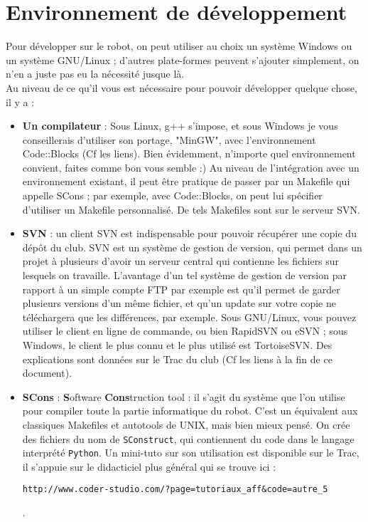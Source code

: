 
\section{Environnement de développement}

Pour développer sur le robot, on peut utiliser au choix un système Windows ou un système GNU/Linux ; d'autres plate-formes peuvent s'ajouter simplement, on n'en a juste pas eu la nécessité jusque là.\\
Au niveau de ce qu'il vous est nécessaire pour pouvoir développer quelque chose, il y a :\\
\begin{itemize}
\item \textbf{Un compilateur} : Sous Linux, g++ s'impose, et sous Windows je vous conseillerais d'utiliser son portage, "MinGW", avec l'environnement Code::Blocks (Cf les liens). Bien évidemment, n'importe quel environnement convient, faites comme bon vous semble :) Au niveau de l'intégration avec un environnement existant, il peut être pratique de passer par un Makefile qui appelle SCons ; par exemple, avec Code::Blocks, on peut lui spécifier d'utiliser un Makefile personnalisé. De tels Makefiles sont sur le serveur SVN.\\
\item \textbf{SVN} : un client SVN est indispensable pour pouvoir récupérer une copie du dépôt du club. SVN est un système de gestion de version, qui permet dans un projet à plusieurs d'avoir un serveur central qui contienne les fichiers sur lesquels on travaille. L'avantage d'un tel système de gestion de version par rapport à un simple compte FTP par exemple est qu'il permet de garder plusieurs versions d'un même fichier, et qu'un update sur votre copie ne téléchargera que les différences, par exemple. Sous GNU/Linux, vous pouvez utiliser le client en ligne de commande, ou bien RapidSVN ou eSVN ; sous Windows, le client le plus connu et le plus utilisé est TortoiseSVN. Des explications sont données sur le Trac du club (Cf les liens à la fin de ce document).\\
\item \textbf{SCons} : \textbf{S}oftware \textbf{Cons}truction tool : il s'agit du système que l'on utilise pour compiler toute la partie informatique du robot. C'est un équivalent aux classiques Makefiles et autotools de UNIX, mais bien mieux pensé. On crée des fichiers du nom de \texttt{SConstruct}, qui contiennent du code dans le langage interprété \texttt{Python}. Un mini-tuto sur son utilisation est disponible sur le Trac, il s'appuie sur le didacticiel plus général qui se trouve ici : \begin{verbatim}http://www.coder-studio.com/?page=tutoriaux_aff&code=autre_5\end{verbatim} .\\

\end{itemize}
